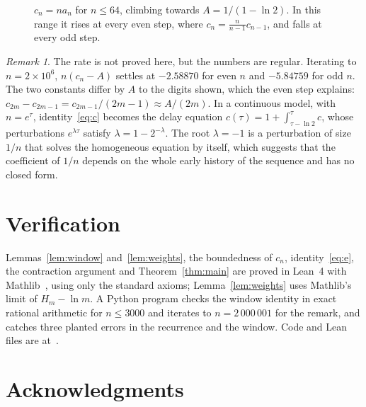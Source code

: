 \documentclass[11pt]{amsart}
\theoremstyle{remark}
\newtheorem{remark}[theorem]{Remark}
\begin{document}
\begin{figure}[ht]
\centering
{}
\caption{$c_n=na_n$ for $n\le64$, climbing towards $A=1/(1-\ln2)$. In this range it rises at every even step, where $c_n=\tfrac{n}{n-1}c_{n-1}$, and falls at every odd step.}
\label{fig:cn}
\end{figure}

\begin{remark}
The rate is not proved here, but the numbers are regular. Iterating to $n=2\times10^6$, $n(c_n-A)$ settles at $-2.58870$ for even $n$ and $-5.84759$ for odd $n$. The two constants differ by $A$ to the digits shown, which the even step explains: $c_{2m}-c_{2m-1}=c_{2m-1}/(2m-1)\approx A/(2m)$. In a continuous model, with $n=e^\tau$, identity~\eqref{eq:c} becomes the delay equation $c(\tau)=1+\int_{\tau-\ln2}^{\tau}c$, whose perturbations $e^{\lambda\tau}$ satisfy $\lambda=1-2^{-\lambda}$. The root $\lambda=-1$ is a perturbation of size $1/n$ that solves the homogeneous equation by itself, which suggests that the coefficient of $1/n$ depends on the whole early history of the sequence and has no closed form.
\end{remark}

\section{Verification}

Lemmas~\ref{lem:window} and~\ref{lem:weights}, the boundedness of $c_n$, identity~\eqref{eq:e}, the contraction argument and Theorem~\ref{thm:main} are proved in Lean~4 with Mathlib~\cite{mathlib}, using only the standard axioms; Lemma~\ref{lem:weights} uses Mathlib's limit of $H_m-\ln m$. A Python program checks the window identity in exact rational arithmetic for $n\le3000$ and iterates to $n=2\,000\,001$ for the remark, and catches three planted errors in the recurrence and the window. Code and Lean files are at~\cite{repo}.

\section*{Acknowledgments}
\end{document}
